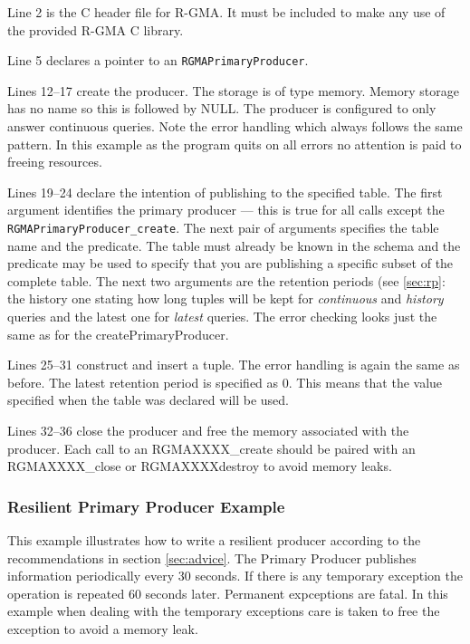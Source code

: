 Line 2 is the C header file for R-GMA. It must be included
to make any use of the provided R-GMA C library.

Line 5 declares a pointer to an \texttt{RGMAPrimaryProducer}.

Lines 12--17 create the producer. The storage is of type memory. Memory
storage has no name so this is followed by NULL. The producer is configured to 
only answer continuous queries. Note the error handling which always follows
the same pattern. In this example as the program quits on all errors no
attention is paid to freeing resources.

Lines 19--24 declare the intention of publishing to the specified
table. The first argument identifies the primary producer --- this is true for
all calls except the \texttt{RGMAPrimaryProducer\_create}. The next
pair of arguments specifies the table name and the predicate. The
table must already be known in the schema and the predicate may be used
to specify that you are publishing a specific subset of the complete
table. The next two arguments are the retention periods (see
\ref{sec:rp}: the history one stating how long tuples will be kept for
\emph{continuous} and
\emph{history} queries and the latest one for \emph{latest} queries.
The error checking looks just the same as for the
createPrimaryProducer. 

Lines 25--31 construct and insert a tuple. The error handling is again
the same as before. The latest retention period is specified as 0. This means
that the value specified when the table was declared will be used.

Lines 32--36 close the producer and free the memory associated with the
producer. Each call to an RGMAXXXX\_create should be paired with an
RGMAXXXX\_close or RGMAXXXXdestroy to avoid memory leaks.


\subsubsection{Resilient Primary Producer Example}

This example illustrates how to write a resilient producer according to the
recommendations in section \ref{sec:advice}. The Primary Producer publishes
information periodically every 30 seconds. If there is any temporary exception
the operation is repeated 60 seconds later. Permanent expceptions are fatal. In
this example  when dealing with the temporary exceptions care is taken to free
the exception to avoid a memory leak.

